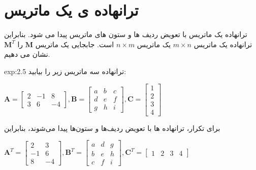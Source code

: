 \section{\textbf{ترانهاده ی یک ماتریس}}
\label{sec:2.3}
{
    \Large
    \begin{spacing}{1.5}
        ترانهاده یک ماتریس با تعویض ردیف ها و ستون های ماتریس پیدا می شود.
        بنابراین ترانهاده یک ماتریس $m\times n$ یک ماتریس $n\times m$ است.
        جابجایی یک ماتریس $\textbf{M}$ را $\textbf{M}^T$ نشان می دهیم.

        \begin{example}{exp:2.5}
            \Large
            ترانهاده سه ماتریس زیر را بیابید:\\

            \begin{center}
                $\textbf{A}=\begin{bmatrix}
                                2 & -1 & 8  \\
                                3 & 6  & -4
                \end{bmatrix}, \textbf{B}=\begin{bmatrix}
                                              a & b & c \\
                                              d & e & f \\
                                              g & h & i
                \end{bmatrix}, \textbf{C}=\begin{bmatrix}
                                              1 \\
                                              2 \\
                                              3 \\
                                              4
                \end{bmatrix}$
            \end{center}

            برای تکرار، ترانهاده ها با تعویض ردیف‌ها و ستون‌ها پیدا می‌شوند، بنابراین

            \begin{center}
                $\textbf{A}^T=\begin{bmatrix}
                                  2  & 3  \\
                                  -1 & 6  \\
                                  8  & -4
                \end{bmatrix}, \textbf{B}^T=\begin{bmatrix}
                                                a & d & g \\
                                                b & e & h \\
                                                c & f & i
                \end{bmatrix}, \textbf{C}^T=\begin{bmatrix}
                                                1 & 2 & 3 & 4
                \end{bmatrix}$
            \end{center}


\end{example}
\end{spacing}}
